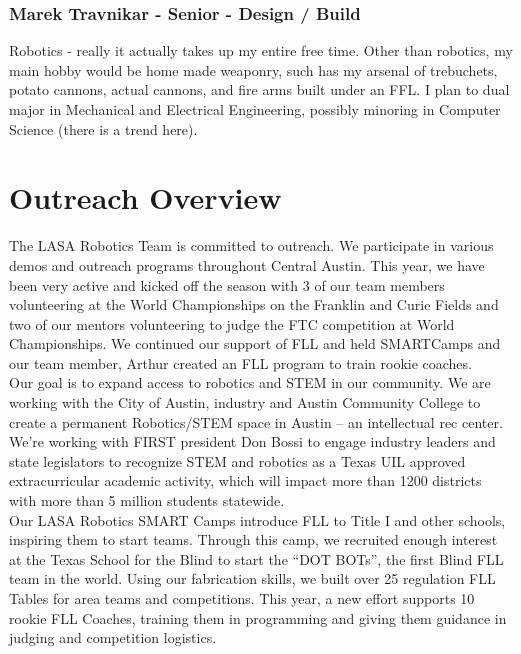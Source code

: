 \subsubsection{Marek Travnikar - Senior - Design / Build} 
Robotics - really it actually takes up my entire free time. Other than robotics, my main hobby would be home made weaponry, such has my arsenal of trebuchets, potato cannons, actual cannons, and fire arms built under an FFL. I plan to dual major in Mechanical and Electrical Engineering, possibly minoring in Computer Science (there is a trend here). 

\clearpage
\newpage

\section{Outreach Overview}
The LASA Robotics Team is committed to outreach.  We participate in various demos and outreach programs throughout Central Austin.  This year, we have been very active and kicked off the season with  3 of our team members volunteering at the World Championships on the Franklin and Curie Fields and two of our mentors volunteering to judge the FTC competition at World Championships.  We continued our support of FLL and held SMARTCamps and our team member, Arthur created an FLL program to train rookie coaches.\\

Our goal is to expand access to robotics and STEM in our community. We are working with the City of Austin, industry and Austin Community College to create a permanent Robotics/STEM space in Austin – an intellectual rec center. We’re working with FIRST president Don Bossi to engage industry leaders and state legislators to recognize STEM and robotics as a Texas UIL approved extracurricular academic activity, which will impact more than 1200 districts with more than 5 million students statewide.\\

Our LASA Robotics SMART Camps introduce FLL to Title I and other schools, inspiring them to start teams. Through this camp, we recruited enough interest at the Texas School for the Blind to start the “DOT BOTs”, the first Blind FLL team in the world. Using our fabrication skills, we built over 25 regulation FLL Tables for area teams and competitions. This year, a new effort supports 10 rookie FLL Coaches, training them in programming and giving them guidance in judging and competition logistics.\\


